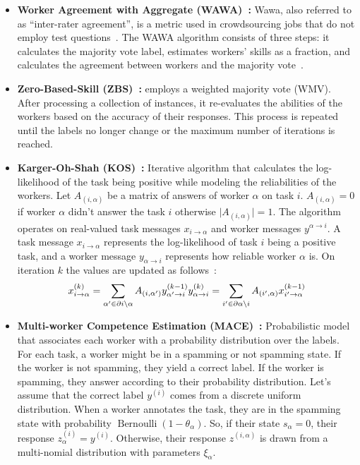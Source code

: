\begin{itemize}
    \item \textbf{Worker Agreement with Aggregate (WAWA)~\cite{crowdkit_webpage_documentation}:} Wawa, also referred to as ``inter-rater agreement'', is a metric used in crowdsourcing jobs that do not employ test questions~\cite{appen_wawa_2023}. The WAWA algorithm consists of three steps: it calculates the majority vote label, estimates workers' skills as a fraction, and calculates the agreement between workers and the majority vote~\cite{crowdkit_webpage_documentation}.

    \item \textbf{Zero-Based-Skill (ZBS)~\cite{crowdkit_webpage_documentation}:} employs a weighted majority vote (WMV). After processing a collection of instances, it re-evaluates the abilities of the workers based on the accuracy of their responses. This process is repeated until the labels no longer change or the maximum number of iterations is reached.

    \item \textbf{Karger-Oh-Shah (KOS)~\cite{crowdkit_webpage_documentation}:} Iterative algorithm that calculates the log-likelihood of the task being positive while modeling the reliabilities of the workers. Let $A_{(i,\alpha)} $ be a matrix of answers of worker $\alpha $ on task $i $. $A_{(i,\alpha)} = 0 $ if worker $\alpha $ didn't answer the task $i $ otherwise $\vert A_{(i,\alpha)} \vert = 1 $. The algorithm operates on real-valued task messages $x_{i \rightarrow \alpha} $  and worker messages $y^{\alpha \rightarrow i} $. A task message $x_{i \rightarrow \alpha} $ represents the log-likelihood of task $i $ being a positive task, and a worker message $y_{\alpha \rightarrow i} $ represents how reliable worker $\alpha $ is. On iteration $k$ the values are updated as follows~\cite{crowdkit_webpage_documentation}:
    \begin{equation}
        x_{i \rightarrow \alpha}^{(k)} = \sum_{\alpha' \in \partial i \backslash \alpha} A_{(i, \alpha')} y_{\alpha' \rightarrow i}^{(k-1)} \\
        y_{\alpha \rightarrow i}^{(k)} = \sum_{i' \in \partial \alpha \backslash i} A_{(i',\alpha)} x_{i' \rightarrow \alpha}^{(k-1)}
    \end{equation}

    \item \textbf{Multi-worker Competence Estimation (MACE)~\cite{hovy_MACE_2013,crowdkit_webpage_documentation}:}
    Probabilistic model that associates each worker with a probability distribution over the labels. For each task, a worker might be in a spamming or not spamming state. If the worker is not spamming, they yield a correct label. If the worker is spamming, they answer according to their probability distribution. Let's assume that the correct label $y^{(i)}$ comes from a discrete uniform distribution. When a worker annotates the task, they are in the spamming state with probability $\operatorname{Bernoulli}(1 - \theta_{\alpha})$. So, if their state $s_{\alpha} = 0$, their response $z^{(i)}_{\alpha} = y^{(i)}$. Otherwise, their response $z^{(i,\alpha)}$ is drawn from a multi-nomial distribution with parameters $\xi_{\alpha}$.


\end{itemize}
